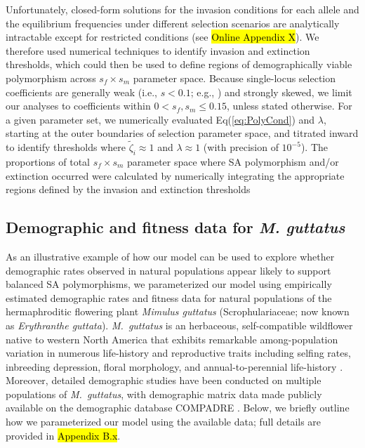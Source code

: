 \documentclass[11pt]{article}
\begin{document}
Unfortunately, closed-form solutions for the invasion conditions for each allele and the equilibrium frequencies under different selection scenarios are analytically intractable except for restricted conditions (see \hl{Online Appendix X}). We therefore used numerical techniques to identify invasion and extinction thresholds, which could then be used to define regions of demographically viable polymorphism across $s_f \times s_m$ parameter space. Because single-locus selection coefficients are generally weak (i.e., $s < 0.1$; e.g., \citealt{Eyre-WalkerKeightly2007}) and strongly skewed, we limit our analyses to coefficients within $0 < s_f,s_m \leq 0.15$, unless stated otherwise. For a given parameter set, we numerically evaluated Eq(\ref{eq:PolyCond}) and $\lambda$, starting at the outer boundaries of selection parameter space, and titrated inward to identify thresholds where $\tilde{\zeta}_i \approx 1$ and $\lambda \approx 1$ (with precision of $10^{-5}$). The proportions of total $s_f \times s_m$ parameter space where SA polymorphism and/or extinction occurred were calculated by numerically integrating the appropriate regions defined by the invasion and extinction thresholds


\subsection*{Demographic and fitness data for {\itshape M. guttatus}} \label{sec:MguttMethods}

As an illustrative example of how our model can be used to explore whether demographic rates observed in natural populations appear likely to support balanced SA polymorphisms, we parameterized our model using empirically estimated demographic rates and fitness data for natural populations of the hermaphroditic flowering plant {\itshape Mimulus guttatus} (Scrophulariaceae; now known as {\itshape Erythranthe guttata}). {\itshape M.~guttatus} is an herbaceous, self-compatible wildflower native to western North America that exhibits remarkable among-population variation in numerous life-history and reproductive traits including selfing rates, inbreeding depression, floral morphology, and annual-to-perennial life-history \citep[e.g.,][]{RitlandGanders1987, Ritland1990, Willis1993, Willis1999a, Willis1999b, WuWillis2008}. Moreover, detailed demographic studies have been conducted on multiple populations of {\itshape M.~guttatus}, with demographic matrix data made publicly available on the demographic database COMPADRE \citep{CompadreDB2020}. Below, we briefly outline how we parameterized our model using the available data; full details are provided in \hl{Appendix B.x}.
\end{document}
